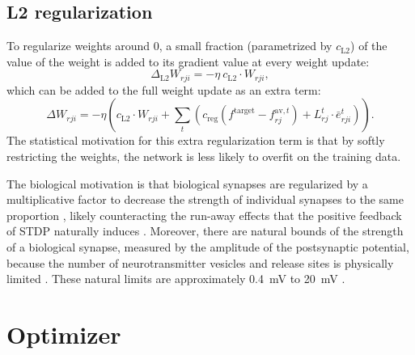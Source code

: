 	\subsection{L2 regularization}
		To regularize weights around 0, a small fraction (parametrized by $c_\text{L2}$) of the value of the weight is added to its gradient value at every weight update:
		\begin{equation}
		\Delta_\text{L2} W_{rji} = -\eta\ c_\text{L2} \cdot W_{rji},
		\end{equation}
		which can be added to the full weight update as an extra term:
		\begin{equation}
		\Delta W_{rji} = -\eta\left(c_\text{L2} \cdot W_{rji} + \sum_t\left(c_\text{reg}\left(f^\text{target} - f^{\text{av}, t}_{rj}\right) + L^t_{rj}\cdot\bar{e}^t_{rji}\right)\right).
		\end{equation}
		The statistical motivation for this extra regularization term is that by softly restricting the weights, the network is less likely to overfit on the training data.

		The biological motivation is that biological synapses are regularized by a multiplicative factor to decrease the strength of individual synapses to the same proportion \citep{turrigiano2000hebb}, likely counteracting the run-away effects that the positive feedback of STDP naturally induces \citep{siddoway2014molecular}.
		Moreover, there are natural bounds of the strength of a biological synapse, measured by the amplitude of the postsynaptic potential, because the number of neurotransmitter vesicles and release sites is physically limited \citep{del1954quantal}.
		These natural limits are approximately \SI{0.4}{\mV} to \SI{20}{\mV} \citep{diaz2006target}.




\section{Optimizer}\label{sec:adam}

